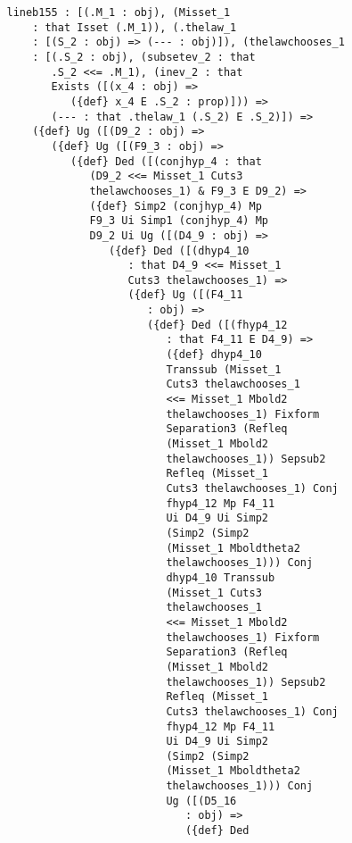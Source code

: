 \documentclass[12pt]{article}
\begin{document}
\begin{verbatim}
   lineb155 : [(.M_1 : obj), (Misset_1 
       : that Isset (.M_1)), (.thelaw_1 
       : [(S_2 : obj) => (--- : obj)]), (thelawchooses_1 
       : [(.S_2 : obj), (subsetev_2 : that 
          .S_2 <<= .M_1), (inev_2 : that 
          Exists ([(x_4 : obj) => 
             ({def} x_4 E .S_2 : prop)])) => 
          (--- : that .thelaw_1 (.S_2) E .S_2)]) => 
       ({def} Ug ([(D9_2 : obj) => 
          ({def} Ug ([(F9_3 : obj) => 
             ({def} Ded ([(conjhyp_4 : that 
                (D9_2 <<= Misset_1 Cuts3 
                thelawchooses_1) & F9_3 E D9_2) => 
                ({def} Simp2 (conjhyp_4) Mp 
                F9_3 Ui Simp1 (conjhyp_4) Mp 
                D9_2 Ui Ug ([(D4_9 : obj) => 
                   ({def} Ded ([(dhyp4_10 
                      : that D4_9 <<= Misset_1 
                      Cuts3 thelawchooses_1) => 
                      ({def} Ug ([(F4_11 
                         : obj) => 
                         ({def} Ded ([(fhyp4_12 
                            : that F4_11 E D4_9) => 
                            ({def} dhyp4_10 
                            Transsub (Misset_1 
                            Cuts3 thelawchooses_1 
                            <<= Misset_1 Mbold2 
                            thelawchooses_1) Fixform 
                            Separation3 (Refleq 
                            (Misset_1 Mbold2 
                            thelawchooses_1)) Sepsub2 
                            Refleq (Misset_1 
                            Cuts3 thelawchooses_1) Conj 
                            fhyp4_12 Mp F4_11 
                            Ui D4_9 Ui Simp2 
                            (Simp2 (Simp2 
                            (Misset_1 Mboldtheta2 
                            thelawchooses_1))) Conj 
                            dhyp4_10 Transsub 
                            (Misset_1 Cuts3 
                            thelawchooses_1 
                            <<= Misset_1 Mbold2 
                            thelawchooses_1) Fixform 
                            Separation3 (Refleq 
                            (Misset_1 Mbold2 
                            thelawchooses_1)) Sepsub2 
                            Refleq (Misset_1 
                            Cuts3 thelawchooses_1) Conj 
                            fhyp4_12 Mp F4_11 
                            Ui D4_9 Ui Simp2 
                            (Simp2 (Simp2 
                            (Misset_1 Mboldtheta2 
                            thelawchooses_1))) Conj 
                            Ug ([(D5_16 
                               : obj) => 
                               ({def} Ded 

\end{verbatim}
\end{document}
